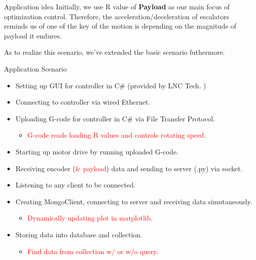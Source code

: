 \documentclass[11pt]{beamer}
\begin{document}
\begin{frame}{Application idea}
Initially, we use R value of \textbf{Payload} as our main focus of optimization control. Therefore, the acceleration/deceleration of escalators reminds us of one of the key of the motion is depending on the magnitude of payload it endures.

As to realize this scenario, we've extended the basic scenario futhermore.
\end{frame}


\begin{frame}{Application Scenario}
  \begin{itemize}
    \item Setting up GUI for controller in C\# (provided by LNC Tech. )
    \item Connecting to controller via wired Ethernet.
    \item Uploading G-code for controller in C\# via File Transfer Protocol.
    \begin{itemize}
      \item \textcolor{red}{G-code reads loading R values and controls rotating speed.}
    \end{itemize}
    \item Starting up motor drive by running uploaded G-code.
    \item Receiving encoder (\textcolor{red}{\& payload}) data and sending to server (.py) via socket.
    \item Listening to any client to be connected.
    \item Creating MongoClient, connecting to server and receiving data simutaneously.
    \begin{itemize}
      \item \textcolor{red}{Dynamically updating plot in matplotlib.}
    \end{itemize}
    \item  Storing data into database and collection.
    \begin{itemize}
      \item \textcolor{red}{Find data from collection w/ or w/o query.}     
    \end{itemize}
  \end{itemize}
\end{frame}
\end{document}
